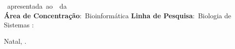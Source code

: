 \documentclass[
	12pt,				%
	oneside,			%
	a4paper,			%
	chapter=TITLE,		%
	section=TITLE,		%
	english,			%
	brazil				%
	]{abntex2}
\begin{document}
\begin{folhadeaprovacao}
	\OnehalfSpacing
	\begin{center}
	\imprimirautor\\%
	\vspace*{10pt}
	\textbf{\imprimirtitulo}%
	\ifnotempty{\imprimirsubtitulo}{:~\imprimirsubtitulo}\\%
	\vspace*{\baselineskip}
	\end{center}
	\imprimirtipotrabalho~apresentada~ao~\imprimirprograma~da~\imprimirinstituicao\\
	\bigskip\newline
	\textbf{Área de Concentração}:~Bioinformática\newline%
	\textbf{Linha de Pesquisa}:~Biologia de Sistemas\newline%
	\imprimirorientadorRotulo:~\imprimirorientador\newline%
	\begin{flushright}
	Natal, \imprimirdata.
	\end{flushright}
	\vspace*{\baselineskip}
	\vspace*{2\baselineskip}

\end{folhadeaprovacao}
\end{document}
